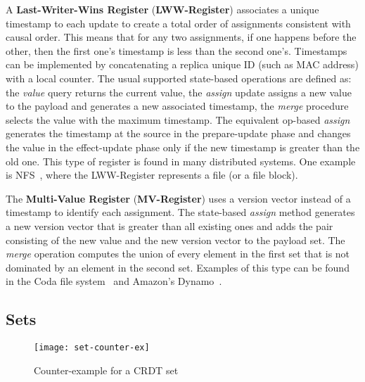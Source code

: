 A \textbf{Last-Writer-Wins Register} (\textbf{LWW-Register}) associates a
unique timestamp to each update to create a total order of assignments
consistent with causal order. This means that for any two assignments, if one
happens before the other, then the first one's timestamp is less than the second
one's. Timestamps can be implemented by concatenating a replica unique ID (such
as MAC address) with a local counter. The usual supported state-based operations
are defined as: the \textit{value} query returns the current value, the
\textit{assign} update assigns a new value to the payload and generates a new
associated timestamp, the \textit{merge} procedure selects the value with the
maximum timestamp. The equivalent op-based \textit{assign} generates the
timestamp at the source in the prepare-update phase and changes the value in the
effect-update phase only if the new timestamp is greater than the old one. This
type of register is found in many distributed systems. One example is
NFS~\cite{Sandberg85designand}, where the LWW-Register represents a file (or a
file block).

The \textbf{Multi-Value Register} (\textbf{MV-Register}) uses a version vector
instead of a timestamp to identify each assignment. The state-based
\textit{assign} method generates a new version vector that is greater than all
existing ones and adds the pair consisting of the new value and the new version
vector to the payload set. The \textit{merge} operation computes the union of
every element in the first set that is not dominated by an element in the second
set. Examples of this type can be found in the Coda file
system~\cite{Howard:1988:SPD:35037.35059} and Amazon's
Dynamo~\cite{DeCandia:2007:DAH:1294261.1294281}.

\subsection{Sets}
\label{sec:sets}

\begin{figure}
  \centering
  \begin{minipage}{1\linewidth}
    \centering
    \texttt{[image: set-counter-ex]}
    \caption{Counter-example for a CRDT set}
    \label{fig:set_counter_ex}
  \end{minipage}
\end{figure}

